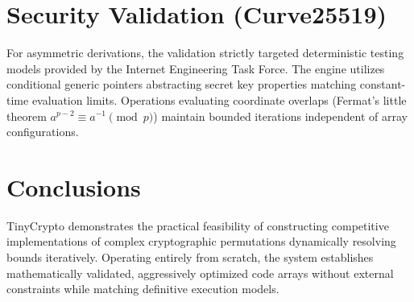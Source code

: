 \documentclass[10pt,twocolumn,letterpaper]{article}
\begin{document}
\begin{table}[h!]
  \centering
  \caption{Aggregation of Performance Benchmarks ($X$ metrics scaling limits on standard executions)}
\end{table}

\section{Security Validation (Curve25519)}
For asymmetric derivations, the validation strictly targeted deterministic testing models provided by the Internet Engineering Task Force. The engine utilizes conditional generic pointers abstracting secret key properties matching constant-time evaluation limits. Operations evaluating coordinate overlaps (Fermat's little theorem $a^{p-2} \equiv a^{-1} \pmod p$) maintain bounded iterations independent of array configurations.

\section{Conclusions}
TinyCrypto demonstrates the practical feasibility of constructing competitive implementations of complex cryptographic permutations dynamically resolving bounds iteratively. Operating entirely from scratch, the system establishes mathematically validated, aggressively optimized code arrays without external constraints while matching definitive execution models.
\end{document}
